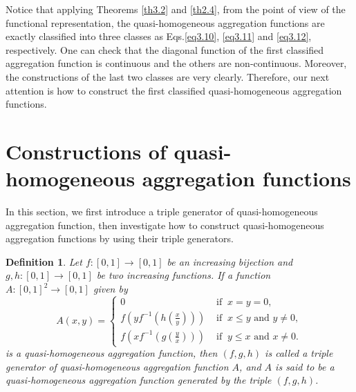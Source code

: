 \documentclass[12pt]{article}
\newtheorem{definition}{\bf Definition}[section]
\begin{document}
Notice that applying Theorems \ref{th3.2} and \ref{th2.4}, from the point of view of the functional representation, the quasi-homogeneous aggregation functions are exactly classified into three classes as Eqs.\eqref{eq3.10}, \eqref{eq3.11} and \eqref{eq3.12}, respectively. One can check that the diagonal function of the first classified aggregation function is continuous and the others are non-continuous. Moreover, the constructions of the last two classes are very clearly. Therefore, our next attention is how to construct the first classified quasi-homogeneous aggregation functions.

\section{Constructions of quasi-homogeneous aggregation functions}
In this section, we first introduce a triple generator of quasi-homogeneous aggregation function, then investigate how to construct quasi-homogeneous aggregation functions by using their triple generators.

\begin{definition}\label{def5.1}
\emph{Let $f:[0, 1] \rightarrow[0, 1]$ be an increasing bijection and $g,h:[0, 1] \rightarrow[0, 1]$ be two increasing functions. If a function $A:[0, 1]^2\rightarrow[0, 1]$ given by
\begin{equation}\label{eq5.1}
A(x,y)= \left\{\begin{array}{ll}
0 & {\mbox{ if }\  x=y=0,}\\
f(yf^{-1}(h(\frac{x}{y}))) & {\mbox{ if }\  x\leq y \mbox{ and }y\neq0,}\\
f(xf^{-1}(g(\frac{y}{x}))) & {\mbox{ if }\  y\leq x \mbox{ and }x\neq0.}
\end{array}
\right.
\end{equation}
is a quasi-homogeneous aggregation function, then $(f, g, h)$ is called a} triple generator \emph{of quasi-homogeneous aggregation function $A$, and $A$ is said to be a quasi-homogeneous aggregation function generated by the triple $(f, g, h)$.}
\end{definition}
\end{document}
